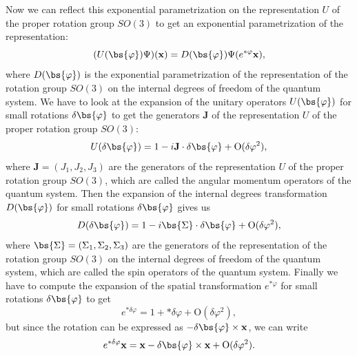 \begin{example}
    Now we can reflect this exponential parametrization on the representation \(U\) of the proper rotation group \(SO(3)\) to get an exponential parametrization of the representation:
    \[
        (U(\bs{\varphi})\Psi)(\mathbf{x}) = D(\bs{\varphi})\Psi(e^{* \varphi}\mathbf{x}),
    \]
    where \(D(\bs{\varphi})\) is the exponential parametrization of the representation of the rotation group \(SO(3)\) on the internal degrees of freedom of the quantum system. We have to look at the expansion of the unitary operators \(U(\bs{\varphi})\) for small rotations \(\delta \bs{\varphi}\) to get the generators \(\mathbf{J}\) of the representation \(U\) of the proper rotation group \(SO(3)\):
    \[
        U(\delta \bs{\varphi}) = 1 - i \mathbf{J} \cdot \delta \bs{\varphi} + \mathrm{O}(\delta \varphi^2),
    \]
    where \(\mathbf{J} = (J_1, J_2, J_3)\) are the generators of the representation \(U\) of the proper rotation group \(SO(3)\), which are called the angular momentum operators of the quantum system. Then the expansion of the internal degrees transformation \(D(\bs{\varphi})\) for small rotations \(\delta \bs{\varphi}\) gives us
    \[
        D(\delta \bs{\varphi}) = 1 - i \bs{\Sigma} \cdot \delta \bs{\varphi} + \mathrm{O}(\delta \varphi^2),
    \]
    where \(\bs{\Sigma} = (\Sigma_1, \Sigma_2, \Sigma_3)\) are the generators of the representation of the rotation group \(SO(3)\) on the internal degrees of freedom of the quantum system, which are called the spin operators of the quantum system. Finally we have to compute the expansion of the spatial transformation \(e^{* \varphi}\) for small rotations \(\delta \bs{\varphi}\) to get
    \[
        e^{* \delta \varphi} = 1 + *\delta \varphi + \mathrm{O}(\delta \varphi^2),
    \]
    but since the rotation can be expressed as \(- \delta \bs{\varphi} \times \mathbf{x}\), we can write
    \[
        e^{* \delta \varphi} \mathbf{x} = \mathbf{x} - \delta \bs{\varphi} \times \mathbf{x} + \mathrm{O}(\delta \varphi^2).
    \]


\end{example}
